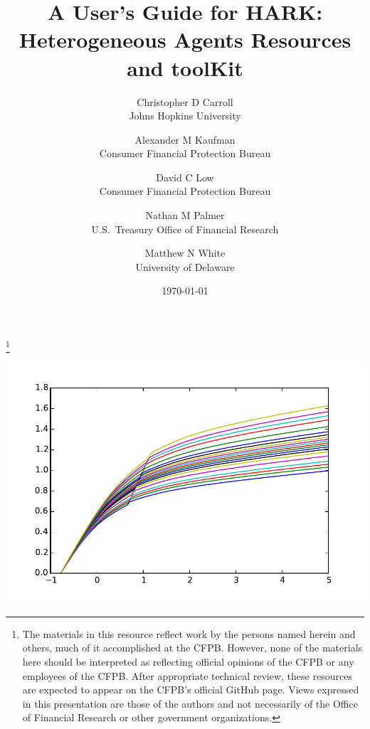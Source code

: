 \documentclass[12pt,titlepage,letterpaper]{econtex}
\begin{document}
\title{\LARGE A User's Guide for HARK: \\ Heterogeneous Agents Resources and toolKit}

\date{\normalsize{\today}}

\author{
{Christopher D Carroll\authNum} \\ {\small Johns Hopkins University}
\and
{Alexander M Kaufman\authNum} \\ {\small Consumer Financial Protection Bureau}
\and
{David C Low\authNum} \\ {\small Consumer Financial Protection Bureau}
\and
{Nathan M Palmer\authNum} \\ {\small U.S.\ Treasury Office of Financial Research}
\and
{Matthew N White\authNum} \\ {\small University of Delaware}
}


\begin{authorsinfo}
\end{authorsinfo}

\thanks{The materials in this resource reflect work by the persons named herein and others, much of it accomplished at the CFPB.  However, none of the materials here should be interpreted as reflecting official opinions of the CFPB or any employees of the CFPB.  After appropriate technical review, these resources are expected to appear on the CFPB's official GitHub page.  Views expressed in this presentation are those of the authors and not necessarily of the Office of Financial Research or other government organizations.}

\maketitle

\begin{center}
\includegraphics[scale=0.8]{UserGuidePic.pdf}
\end{center}
\end{document}
